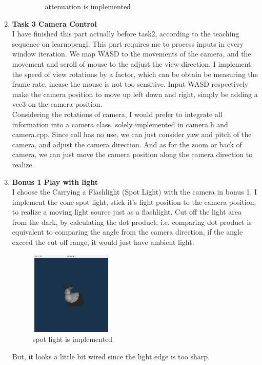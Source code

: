 \documentclass[acmtog]{acmart}
\begin{document}
\begin{enumerate}
\begin{enumerate}
\begin{figure}[h]
			\caption{attenuation is implemented}
			\end{figure}
	\end{enumerate}	
	\item \textbf{Task 3 Camera Control}\\
	I have finished this part actually before task2, according to the teaching sequence on learnopengl. This part requires me to process inputs in every window iteration. We map WASD to the movements of the camera, and the movement and scroll of mouse to the adjust the view direction.
	I implement the speed of view rotations by a factor, which can be obtain be measuring the frame rate, incase the mouse is not too sensitive. Input WASD respectively make the camera position to move up left down and right, simply be adding a vec3 on the camera position.\\
	Considering the rotations of camera, I would prefer to integrate all information into a camera class, solely implemented in camera.h and camera.cpp. Since roll has no use, we can just consider yaw and pitch of the camera, and adjust the camera direction. And as for the zoom or back of camera, we can just move the camera position along the camera direction to realize.
	\item \textbf{Bonus 1 Play with light}\\
	I choose the Carrying a Flashlight (Spot Light) with the camera in bonus 1. I implement the cone spot light, stick it's light position to the camera position, to realize a moving light source just as a flashlight. Cut off the light area from the dark, by calculating the dot product, i.e. comparing dot product is equivalent to comparing the angle from the camera direction, if the angle exceed the cut off range, it would just have ambient light.\\
	\begin{figure}[h]
		\includegraphics[width=4cm,height=4cm]{bunny_spot.png}
		\caption{spot light is implemented}
		\end{figure}
	But, it looks a little bit wired since the light edge is too sharp. 
	\begin{figure}[h]

\end{figure}
\end{enumerate}
\end{document}
